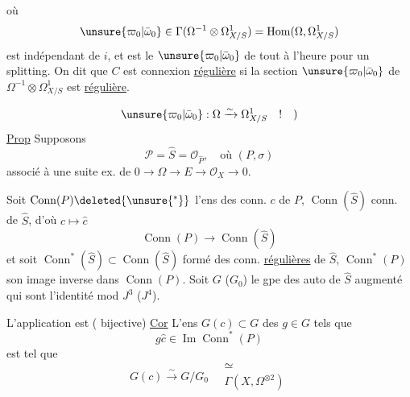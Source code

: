 où
\[\unsure{\varpi_0|\bar\omega_0}\in\Gamma(\Omega^{-1}\otimes\Omega^1_{X/S})=\operatorname{Hom}(\Omega,\Omega^1_{X/S})\]
est indépendant de $i$, et est le $\unsure{\varpi_0|\bar\omega_0}$ de tout à l'heure pour un splitting. On dit que $C$ est connexion \uline{régulière} si la section $\unsure{\varpi_0|\bar\omega_0}$ de $\Omega^{-1}\otimes\Omega^1_{X/S}$ est \uline{régulière}.

 
\[\unsure{\varpi_0|\bar\omega_0}:\Omega\xrightarrow{\sim}\Omega^1_{X/S}\quad!\quad)\]
\uline{Prop}  Supposons
\[\mathcal P=\widehat S=\mathcal O_{\widehat P},\quad\text{où }(P,\sigma)\]
associé à une suite ex. de $0\longrightarrow\Omega\longrightarrow E\longrightarrow\mathcal O_X\longrightarrow0$.

Soit  $\operatorname{Conn}(P)\deleted{\unsure{^{*}}}$ l'ens des conn.  $c$ de $P$,  $\operatorname{Conn}(\widehat S)$  conn. de $\widehat S$, d'où $c\longmapsto\hat c$
\[\operatorname{Conn}(P)\longrightarrow\operatorname{Conn}(\widehat S)\]
et soit $\operatorname{Conn}^{*}(\widehat S)\subset\operatorname{Conn}(\widehat S)$ formé des conn. \uline{régulières}  de $\widehat S$, $\operatorname{Conn}^{*}(P)$ son image inverse dans $\operatorname{Conn}(P)$. Soit $G$ ($G_0$) le gpe des auto de $\widehat S$ augmenté qui sont l'identité mod $J^3$ ($J^4$).

 L'application
est  ( bijective)
\uline{Cor} 
L'ens $G(c)\subset G$ des $g\in G$ tels que
\[g\hat c\in\operatorname{Im}\operatorname{Conn}^{*}(P)\]
est tel que
\[
G(c)\xrightarrow{\sim}G/G_0\quad\begin{matrix}\simeq\\\Gamma(X,\Omega^{\otimes2})\end{matrix}
\]
